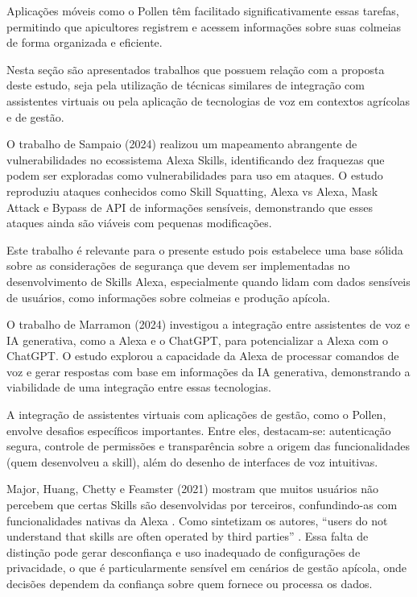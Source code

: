 Aplicações móveis como o Pollen têm facilitado significativamente essas tarefas, permitindo que apicultores registrem e acessem informações sobre suas colmeias de forma organizada e eficiente.


Nesta seção são apresentados trabalhos que possuem relação com a proposta deste estudo, seja pela utilização de técnicas similares de integração com assistentes virtuais ou pela aplicação de tecnologias de voz em contextos agrícolas e de gestão.


O trabalho de Sampaio (2024) realizou um mapeamento abrangente de vulnerabilidades no ecossistema Alexa Skills, identificando dez fraquezas que podem ser exploradas como vulnerabilidades para uso em ataques. 
O estudo reproduziu ataques conhecidos como Skill Squatting, Alexa vs Alexa, Mask Attack e Bypass de API de informações sensíveis, demonstrando que esses ataques ainda são viáveis com pequenas modificações.

Este trabalho é relevante para o presente estudo pois estabelece uma base sólida sobre as considerações de segurança que devem ser implementadas no desenvolvimento de Skills Alexa, 
especialmente quando lidam com dados sensíveis de usuários, como informações sobre colmeias e produção apícola.


O trabalho de Marramon (2024) investigou a integração entre assistentes de voz e IA generativa, como a Alexa e o ChatGPT, para potencializar a Alexa com o ChatGPT.
O estudo explorou a capacidade da Alexa de processar comandos de voz e gerar respostas com base em informações da IA generativa, demonstrando a viabilidade de uma integração entre essas tecnologias.


A integração de assistentes virtuais com aplicações de gestão, como o Pollen, envolve desafios específicos importantes. Entre eles, destacam-se: autenticação segura, controle de permissões e transparência sobre a origem das funcionalidades (quem desenvolveu a skill), além do desenho de interfaces de voz intuitivas.

Major, Huang, Chetty e Feamster (2021) mostram que muitos usuários não percebem que certas Skills são desenvolvidas por terceiros, confundindo-as com funcionalidades nativas da Alexa \cite{major2021alexa}. Como sintetizam os autores, “users do not understand that skills are often operated by third parties” \cite{major2021alexa}. Essa falta de distinção pode gerar desconfiança e uso inadequado de configurações de privacidade, o que é particularmente sensível em cenários de gestão apícola, onde decisões dependem da confiança sobre quem fornece ou processa os dados.


